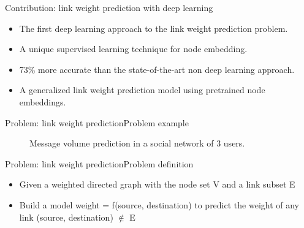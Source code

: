 \documentclass{beamer}
\begin{document}
\begin{frame}{Contribution: link weight prediction with deep learning}
	\begin{itemize}
		\item The first deep learning approach to the link weight prediction problem.
		\item A unique supervised learning technique for node embedding.
		\item 73\% more accurate than the state-of-the-art non deep learning approach.
		\item A generalized link weight prediction model using pretrained node embeddings.
	\end{itemize}
\end{frame}

\begin{frame}{Problem: link weight prediction}{Problem example}
	\begin{figure}[H]\centering
		\caption{Message volume prediction in a social network of 3 users.}
		\label{fig:example}
	\end{figure}
\end{frame}

\begin{frame}{Problem: link weight prediction}{Problem definition}
	\begin{itemize}
		\item Given a weighted directed graph with the node set V and a link subset E
		\item Build a model weight = f(source, destination) to predict the weight of any link (source, destination) $ \notin $ E
	\end{itemize}
\end{frame}
\end{document}
